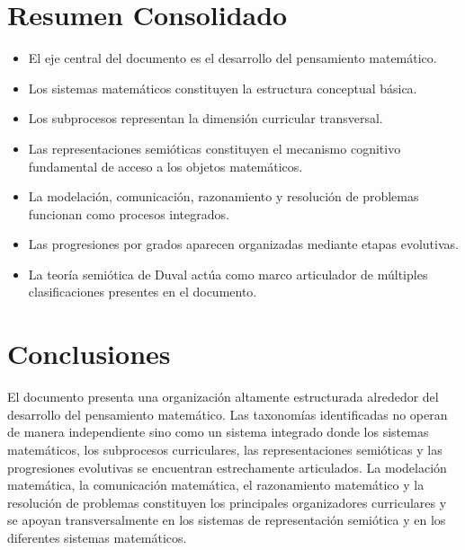 \documentclass[11pt,a4paper]{article}
\begin{document}
	\begin{center}
	\end{center}
	
	\section{Resumen Consolidado}
	
	\begin{itemize}
		\item El eje central del documento es el desarrollo del pensamiento matemático.
		\item Los sistemas matemáticos constituyen la estructura conceptual básica.
		\item Los subprocesos representan la dimensión curricular transversal.
		\item Las representaciones semióticas constituyen el mecanismo cognitivo fundamental de acceso a los objetos matemáticos.
		\item La modelación, comunicación, razonamiento y resolución de problemas funcionan como procesos integrados.
		\item Las progresiones por grados aparecen organizadas mediante etapas evolutivas.
		\item La teoría semiótica de Duval actúa como marco articulador de múltiples clasificaciones presentes en el documento.
	\end{itemize}
	
	\section{Conclusiones}
	
	El documento presenta una organización altamente estructurada alrededor del desarrollo del pensamiento matemático. Las taxonomías identificadas no operan de manera independiente sino como un sistema integrado donde los sistemas matemáticos, los subprocesos curriculares, las representaciones semióticas y las progresiones evolutivas se encuentran estrechamente articulados. La modelación matemática, la comunicación matemática, el razonamiento matemático y la resolución de problemas constituyen los principales organizadores curriculares y se apoyan transversalmente en los sistemas de representación semiótica y en los diferentes sistemas matemáticos.
	
\end{document}
